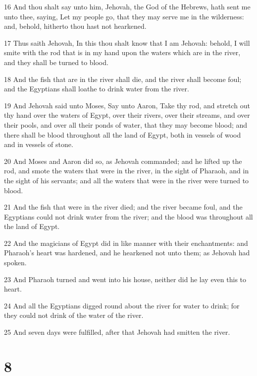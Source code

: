 \par 16 And thou shalt say unto him, Jehovah, the God of the Hebrews, hath sent me unto thee, saying, Let my people go, that they may serve me in the wilderness: and, behold, hitherto thou hast not hearkened.
\par 17 Thus saith Jehovah, In this thou shalt know that I am Jehovah: behold, I will smite with the rod that is in my hand upon the waters which are in the river, and they shall be turned to blood.
\par 18 And the fish that are in the river shall die, and the river shall become foul; and the Egyptians shall loathe to drink water from the river.
\par 19 And Jehovah said unto Moses, Say unto Aaron, Take thy rod, and stretch out thy hand over the waters of Egypt, over their rivers, over their streams, and over their pools, and over all their ponds of water, that they may become blood; and there shall be blood throughout all the land of Egypt, both in vessels of wood and in vessels of stone.
\par 20 And Moses and Aaron did so, as Jehovah commanded; and he lifted up the rod, and smote the waters that were in the river, in the sight of Pharaoh, and in the sight of his servants; and all the waters that were in the river were turned to blood.
\par 21 And the fish that were in the river died; and the river became foul, and the Egyptians could not drink water from the river; and the blood was throughout all the land of Egypt.
\par 22 And the magicians of Egypt did in like manner with their enchantments: and Pharaoh's heart was hardened, and he hearkened not unto them; as Jehovah had spoken.
\par 23 And Pharaoh turned and went into his house, neither did he lay even this to heart.
\par 24 And all the Egyptians digged round about the river for water to drink; for they could not drink of the water of the river.
\par 25 And seven days were fulfilled, after that Jehovah had smitten the river.

\chapter{8}

